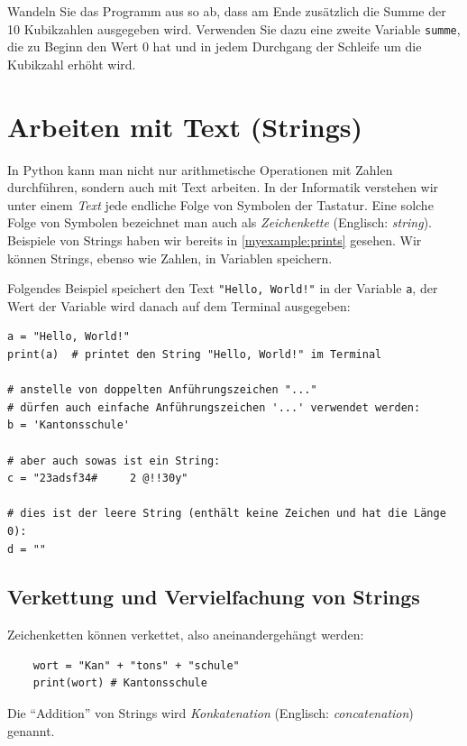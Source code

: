 \begin{myexercise}
	Wandeln Sie das Programm aus  so ab, dass am Ende zusätzlich die Summe der 10 Kubikzahlen ausgegeben wird. Verwenden Sie dazu eine zweite Variable \lstinline|summe|, die zu Beginn den Wert 0 hat und in jedem Durchgang der Schleife um die Kubikzahl erhöht wird.
	\begin{myanswer}
		
	\end{myanswer}
\end{myexercise}
\section{Arbeiten mit Text (Strings)}
In Python kann man nicht nur arithmetische Operationen mit Zahlen durchführen, sondern auch mit Text arbeiten. In der Informatik verstehen wir unter einem \emph{Text} jede endliche Folge von Symbolen der Tastatur. Eine solche Folge von Symbolen bezeichnet man auch als \emph{Zeichenkette} (Englisch: \emph{string}). Beispiele von Strings haben wir bereits in \cref{myexample:prints} gesehen. Wir können Strings, ebenso wie Zahlen, in Variablen speichern.

\begin{myexample}\label{ex:text-in-variables}
Folgendes Beispiel speichert den Text \lstinline|"Hello, World!"| in der Variable \texttt{a}, der Wert der Variable wird danach auf dem Terminal ausgegeben:
\begin{lstlisting}
a = "Hello, World!"
print(a)  # printet den String "Hello, World!" im Terminal 

# anstelle von doppelten Anführungszeichen "..."
# dürfen auch einfache Anführungszeichen '...' verwendet werden:
b = 'Kantonsschule'

# aber auch sowas ist ein String:
c = "23adsf34#     2 @!!30y"

# dies ist der leere String (enthält keine Zeichen und hat die Länge 0):
d = ""
\end{lstlisting}
\end{myexample}

\subsection{Verkettung und Vervielfachung von Strings}
Zeichenketten können verkettet, also aneinandergehängt werden:
\begin{lstlisting}
	wort = "Kan" + "tons" + "schule"
	print(wort) # Kantonsschule
\end{lstlisting}
Die \enquote{Addition} von Strings wird \emph{Konkatenation} (Englisch: \emph{concatenation}) genannt.

